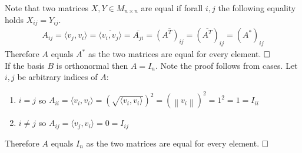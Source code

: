 \documentclass[fleqn]{article}
\newcommand{\qed}{\hfill\ensuremath{\square}}
\newcommand{\normF}[1]{\left\lVert#1\right\rVert}
\begin{document}
Note that two matrices $X, Y \in M_{n\times n}$ are equal if forall $i,j$ the
following equality holds $X_{ij} = Y_{ij}$.
\begin{align*}
  A_{ij}
  = \langle v_j, v_i \rangle
  = \overline{\langle v_i, v_j \rangle}
  = \overline{A_{ji}}
  = \overline{(A^T)_{ij}}
  = \left (\overline{A^T}\right )_{ij}
  = (A^*)_{ij}
\end{align*}
Therefore $A$ equals $A^*$ as the two matrices are equal for every element. $\qed$ \\

If the basis $B$ is orthonormal then $A = I_n$. Note the proof follows from cases.
Let $i,j$ be arbitrary indices of $A$:
\begin{enumerate}[label=\roman*:]
\item $i=j$ so
  $A_{ii}
  = \langle v_i, v_i \rangle
  = (\sqrt{\langle v_i, v_i \rangle})^2
  = (\normF{v_i})^2
  = 1^2 = 1 = I_{ii}$
\item $i \neq j$ so
  $A_{ij} = \langle v_j, v_i \rangle = 0 = I_{ij}$
\end{enumerate}
Therefore $A$ equals $I_n$ as the two matrices are equal for every element. $\qed$ \\
\end{document}
